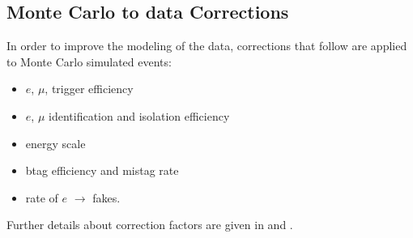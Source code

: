 \subsection{Monte Carlo to data Corrections}
\label{sec:scaleFactors}
In order to improve the modeling of the data, corrections that follow are
 applied  to Monte Carlo simulated events:
\begin{itemize}
\item $e$, $\mu$, \Tau trigger efficiency
\item $e$, $\mu$ identification and isolation efficiency
\item \Tau energy scale
\item btag efficiency and mistag rate
\item rate of $e$ $\rightarrow$ \Tau  fakes.
\end{itemize}
Further details about correction factors  are given in \cite{CMS_AN_2013-171} and \cite{HiggsTauTautwiki}.
